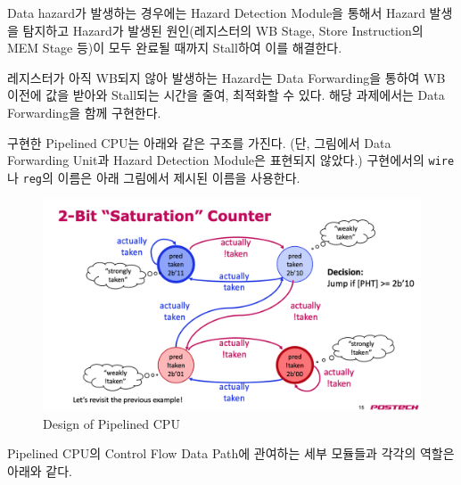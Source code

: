 \documentclass[openright, a4paper]{article}
\newcommand{\code}[1]{\texttt{#1}}
\begin{document}
\hfill

Data hazard가 발생하는 경우에는 Hazard Detection Module을 통해서 Hazard 발생을 탐지하고 Hazard가 발생된 원인(레지스터의 WB Stage, Store Instruction의 MEM Stage 등)이 모두 완료될 때까지 Stall하여 이를 해결한다.

\hfill

레지스터가 아직 WB되지 않아 발생하는 Hazard는 Data Forwarding을 통하여 WB 이전에 값을 받아와 Stall되는 시간을 줄여, 최적화할 수 있다. 해당 과제에서는 Data Forwarding을 함께 구현한다.

\hfill

구현한 Pipelined CPU는 아래와 같은 구조를 가진다. (단, 그림에서 Data Forwarding Unit과 Hazard Detection Module은 표현되지 않았다.) 구현에서의 \code{wire}나 \code{reg}의 이름은 아래 그림에서 제시된 이름을 사용한다.

\hfill

{
    \begin{figure}[!h]
        \centering
        \includegraphics[width=\textwidth]{img/2bit_saturation_counter_FSM_diagram.png}
        \caption{Design of Pipelined CPU}
    \end{figure}
}

\hfill

Pipelined CPU의 Control Flow Data Path에 관여하는 세부 모듈들과 각각의 역할은 아래와 같다.

\hfill
\end{document}

